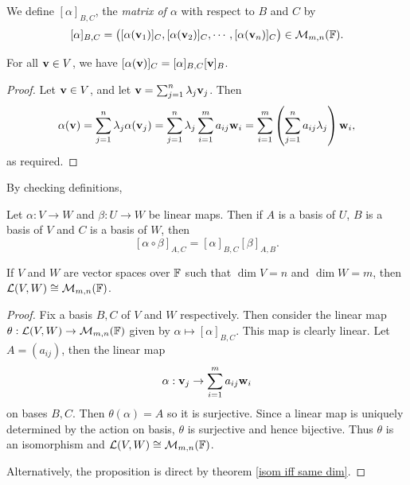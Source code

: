 \documentclass[a4paper]{article}
\begin{document}
\begin{definition}
    We define $[\alpha]_{B, C}$, the \emph{matrix of $\alpha$} with respect to $B$ and $C$ by
    $$
    [\alpha]_{B, C} = \begin{pmatrix}
        [\alpha({\bf v}_1)]_C, [\alpha({\bf v}_2)]_C, \cdots, [\alpha({\bf v}_n)]_C
    \end{pmatrix} \in \mathcal{M}_{m, n}({\mathbb{F}}).
    $$ 
\end{definition}
\begin{lemma}
    For all $\mathbf{v} \in V$, we have $[\alpha(\mathbf{v})]_C = [\alpha]_{B,C}  [\mathbf{v}]_B$.
\end{lemma}
\begin{proof}
    Let $\mathbf{v} \in V$, and let $\mathbf{v} = \sum_{j = 1}^n \lambda_j \mathbf{v}_j$. Then
    $$
    \alpha(\mathbf{v}) = \sum_{j = 1}^n \lambda_j \alpha(\mathbf{v}_j) = \sum_{j = 1}^n \lambda_j \sum_{i = 1}^m a_{ij} \mathbf{w}_i = \sum_{i = 1}^m \left(\sum_{j = 1}^n a_{ij} \lambda_j\right) \mathbf{w}_i,
    $$
    as required.
\end{proof}
By checking definitions,
\begin{lemma}
    Let $\alpha: V \rightarrow W$ and $\beta: U \rightarrow W$ be linear maps. Then if $A$ is a basis of $U$, $B$ is a basis of $V$ and $C$ is a basis of $W$, then
    $$
    [\alpha \circ \beta]_{A, C} = [\alpha]_{B, C}  [\beta]_{A, B}.
    $$
\end{lemma}
\begin{proposition}
    If $V$ and $W$ are vector spaces over ${\mathbb{F}}$ such that $\dim V = n$ and $\dim W = m$, then $\mathcal{L}(V, W) \cong \mathcal{M}_{m, n}({\mathbb{F}})$.
\end{proposition}
\begin{proof}
    Fix a basis $B, C$ of $V$ and $W$ respectively.
    Then consider the linear map
    $
    \theta: \mathcal{L}(V, W) \rightarrow \mathcal{M}_{m, n}({\mathbb{F}})
    $ given by $\alpha \mapsto [\alpha]_{B, C}$.
    This map is clearly linear. Let $ A=(a_{ij}) $, then the linear map 
    \[
        \alpha: {\bf v}_j\to \sum_{i=1}^{m}a_{ij}\mathbf{w}_i
    \]
    on bases $B,C$. Then $ \theta(\alpha)=A $ so it is surjective. Since a linear map is uniquely determined by the action on basis, $ \theta $ is surjective and hence bijective. Thus $\theta$ is an isomorphism and $ {\mathcal{L}}(V,W) \cong {\mathcal{M}}_{m,n}({\mathbb{F}}) $. 

    Alternatively, the proposition is direct by theorem \ref{isom iff same dim}.
\end{proof}
\end{document}

